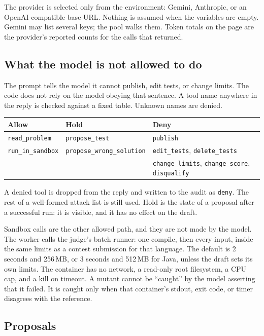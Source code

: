 \documentclass[10pt,a4paper]{article}
\begin{document}
The provider is selected only from the environment: Gemini, Anthropic, or an OpenAI-compatible base URL. Nothing is assumed when the variables are empty. Gemini may list several keys; the pool walks them. Token totals on the page are the provider's reported counts for the calls that returned.

\subsection{What the model is not allowed to do}

The prompt tells the model it cannot publish, edit tests, or change limits. The code does not rely on the model obeying that sentence. A tool name anywhere in the reply is checked against a fixed table. Unknown names are denied.

\needspace{4.8cm}
\begin{center}
\small
\begin{tabular}{@{}l l l@{}}
\toprule
\textbf{Allow} & \textbf{Hold} & \textbf{Deny} \\
\midrule
\texttt{read\_problem} & \texttt{propose\_test} & \texttt{publish} \\
\texttt{run\_in\_sandbox} & \texttt{propose\_wrong\_solution} & \texttt{edit\_tests}, \texttt{delete\_tests} \\
 & & \texttt{change\_limits}, \texttt{change\_score}, \texttt{disqualify} \\
\bottomrule
\end{tabular}
\end{center}

A denied tool is dropped from the reply and written to the audit as \texttt{deny}. The rest of a well-formed attack list is still used. Hold is the state of a proposal after a successful run: it is visible, and it has no effect on the draft.

Sandbox calls are the other allowed path, and they are not made by the model. The worker calls the judge's batch runner: one compile, then every input, inside the same limits as a contest submission for that language. The default is 2 seconds and 256\,MB, or 3 seconds and 512\,MB for Java, unless the draft sets its own limits. The container has no network, a read-only root filesystem, a CPU cap, and a kill on timeout. A mutant cannot be ``caught'' by the model asserting that it failed. It is caught only when that container's stdout, exit code, or timer disagrees with the reference.

\subsection{Proposals}
\end{document}
